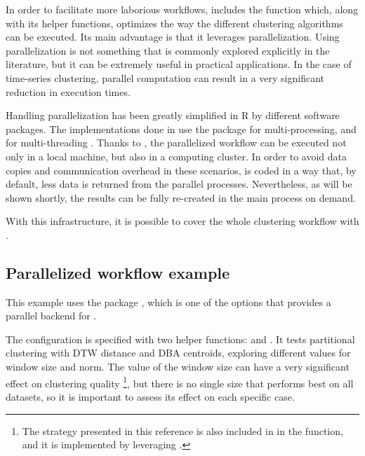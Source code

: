 In order to facilitate more laborious workflows,
\dtwclust{} includes the  function which,
along with its helper functions,
optimizes the way the different clustering algorithms can be executed.
Its main advantage is that it leverages parallelization.
Using parallelization is not something that is commonly explored explicitly in the literature,
but it can be extremely useful in practical applications.
In the case of time-series clustering,
parallel computation can result in a very significant reduction in execution times.

Handling parallelization has been greatly simplified in R by different software packages.
The implementations done in \dtwclust{} use the  package \citep{foreach} for multi-processing,
and  for multi-threading \citep{rcppparallel}.
Thanks to , the parallelized workflow can be executed not only in a local machine,
but also in a computing cluster.
In order to avoid data copies and communication overhead in these scenarios,
 is coded in a way that,
by default,
less data is returned from the parallel processes.
Nevertheless, as will be shown shortly,
the results can be fully re-created in the main process on demand.

With this infrastructure,
it is possible to cover the whole clustering workflow with \dtwclust{}.

\subsection{Parallelized workflow example}

This example uses the  package \citep{doParallel},
which is one of the options that provides a parallel backend for .

The configuration is specified with two helper functions:
 and .
It tests partitional clustering with DTW distance and DBA centroids,
exploring different values for window size and norm.
The value of the window size can have a very significant effect on clustering quality \citep{dau2016}%
\footnote{The strategy presented in this reference is also included in \dtwclust{} in the  function,
and it is implemented by leveraging .},
but there is no single size that performs best on all datasets,
so it is important to assess its effect on each specific case.

